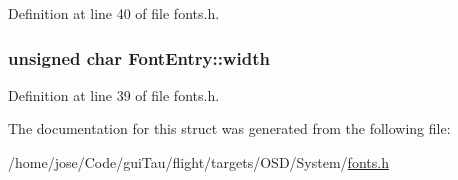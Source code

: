 Definition at line 40 of file fonts.\-h.

\hypertarget{struct_font_entry_a56370306b33f87e74720552479ac8c4e}{
\subsubsection[{width}]{\setlength{\rightskip}{0pt plus 5cm}unsigned char Font\-Entry\-::width}}\label{struct_font_entry_a56370306b33f87e74720552479ac8c4e}


Definition at line 39 of file fonts.\-h.



The documentation for this struct was generated from the following file\-:\begin{DoxyCompactItemize}
\item 
/home/jose/\-Code/gui\-Tau/flight/targets/\-O\-S\-D/\-System/\hyperlink{fonts_8h}{fonts.\-h}\end{DoxyCompactItemize}
